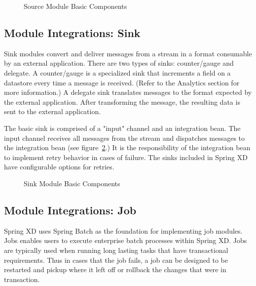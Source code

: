 \par

\begin{figure}[ht]
\centering
{}
\caption{Source Module Basic Components}
\label{fig:sourcembc}
\end{figure}

\subsection{Module Integrations: Sink}
Sink modules convert and deliver messages from a stream in a format consumable by an external application.
There are two types of sinks: counter/gauge and delegate.
A counter/gauge is a specialized sink that increments a field on a datastore every time a
message is received. (Refer to the Analytics section for more information.)  A delegate
sink translates messages to the format expected by the external application.
After transforming the message, the resulting data is sent to the external application.

\par

The basic sink is comprised of a "input" channel and an integration bean.
The input channel receives all messages from the stream and dispatches
messages to the integration bean (see figure~\ref{fig:sinkmbc}.) It is the responsibility of
the integration bean to implement retry behavior in cases of failure. The sinks included
in Spring XD have configurable options for retries.

\par

\begin{figure}
\centering
{}
\caption{Sink Module Basic Components}
\label{fig:sinkmbc}
\end{figure}

\subsection{Module Integrations: Job}
Spring XD uses Spring Batch \cite{spring-batch-reference} as the foundation for implementing
job modules.  Jobs enables users to execute enterprise batch processes within Spring XD.
Jobs are typically used when running long lasting tasks that have transactional requirements.
Thus in cases that the job fails, a job can be designed to be restarted and
pickup where it left off or rollback the changes that were in transaction.

